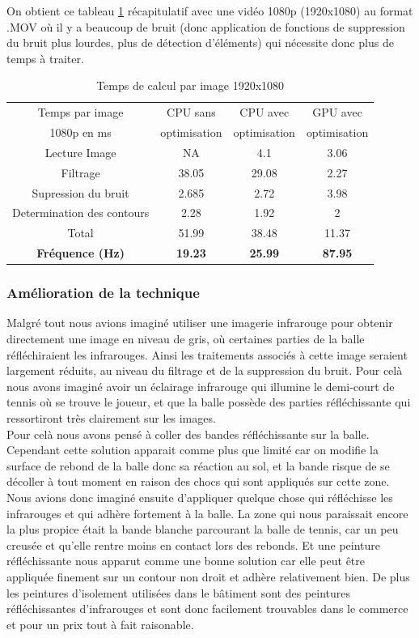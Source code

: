 On obtient ce tableau \ref{perf_opencv} récapitulatif avec une vidéo 1080p (1920x1080) au format .MOV où il y a beaucoup de bruit (donc application de fonctions de suppression du bruit plus lourdes, plus de détection d'éléments) qui nécessite donc plus de temps à traiter.

\begin{table}[h]
	\centering
		\begin{tabular}{|c|c|c|c|}
		\hline
		Temps par image & CPU sans & CPU avec & GPU avec \\
		1080p en ms & optimisation & optimisation & optimisation \\
		\hline
		Lecture Image & NA & 4.1 & 3.06 \\
		\hline
		Filtrage & 38.05 & 29.08 & 2.27\\
		\hline
		Supression du bruit & 2.685 & 2.72 & 3.98\\
		\hline
		Determination des contours & 2.28 & 1.92 & 2\\
		\hline
		Total & 51.99 & 38.48 & 11.37\\
		\hline
		\textbf{Fréquence (Hz)} & \textbf{19.23} & \textbf{25.99} & \textbf{87.95}\\
		\hline
		\end{tabular}
	\caption{Temps de calcul par image 1920x1080}
	\label{perf_opencv}
\end{table}

\subsubsection{Amélioration de la technique}

Malgré tout nous avions imaginé utiliser une imagerie infrarouge pour obtenir directement une image en niveau de gris, où certaines parties de la balle réfléchiraient les infrarouges. Ainsi les traitements associés à cette image seraient largement réduits, au niveau du filtrage et de la suppression du bruit. Pour celà nous avons imaginé avoir un éclairage infrarouge qui illumine le demi-court de tennis où se trouve le joueur, et que la balle possède des parties réfléchissante qui ressortiront très clairement sur les images.\\

Pour celà nous avons pensé à coller des bandes réfléchissante sur la balle. Cependant cette solution apparait comme plus que limité car on modifie la surface de rebond de la balle donc sa réaction au sol, et la bande risque de se décoller à tout moment en raison des chocs qui sont appliqués sur cette zone. Nous avions donc imaginé ensuite d'appliquer quelque chose qui réfléchisse les infrarouges et qui adhère fortement à la balle. La zone qui nous paraissait encore la plus propice était la bande blanche parcourant la balle de tennis, car un peu creusée et qu'elle rentre moins en contact lors des rebonds. Et une peinture réfléchissante nous apparut comme une bonne solution car elle peut être appliquée finement sur un contour non droit et adhère relativement bien. De plus les peintures d'isolement utilisées dans le bâtiment sont des peintures réfléchissantes d'infrarouges et sont donc facilement trouvables dans le commerce et pour un prix tout à fait raisonable.\\

